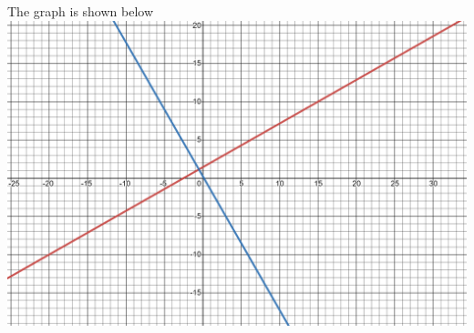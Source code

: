 \documentclass{article}
\begin{document}
\begin{description}
    The graph is shown below\\
    \includegraphics[scale = 0.1]{1c}
    
    
\end{description}
\end{document}
